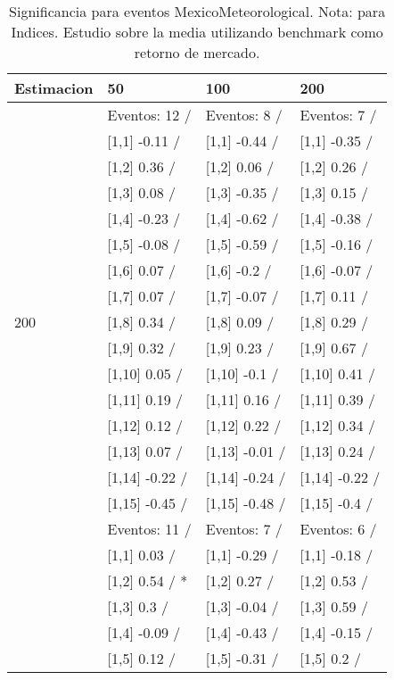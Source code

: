 \begin{table}

\caption{Significancia para eventos MexicoMeteorological. Nota: para Indices. Estudio sobre la media utilizando benchmark como retorno de mercado.}
\centering
\begin{tabular}[t]{llll}
\toprule
Estimacion & 50 & 100 & 200\\
\midrule
 & Eventos:  12 / & Eventos:  8 / & Eventos:  7 /\\
 & {}[1,1] -0.11  / & {}[1,1] -0.44  / & {}[1,1] -0.35  /\\
 & {}[1,2] 0.36  / & {}[1,2] 0.06  / & {}[1,2] 0.26  /\\
 & {}[1,3] 0.08  / & {}[1,3] -0.35  / & {}[1,3] 0.15  /\\
 & {}[1,4] -0.23  / & {}[1,4] -0.62  / & {}[1,4] -0.38  /\\
\addlinespace
 & {}[1,5] -0.08  / & {}[1,5] -0.59  / & {}[1,5] -0.16  /\\
 & {}[1,6] 0.07  / & {}[1,6] -0.2  / & {}[1,6] -0.07  /\\
 & {}[1,7] 0.07  / & {}[1,7] -0.07  / & {}[1,7] 0.11  /\\
200 & {}[1,8] 0.34  / & {}[1,8] 0.09  / & {}[1,8] 0.29  /\\
 & {}[1,9] 0.32  / & {}[1,9] 0.23  / & {}[1,9] 0.67  /\\
\addlinespace
 & {}[1,10] 0.05  / & {}[1,10] -0.1  / & {}[1,10] 0.41  /\\
 & {}[1,11] 0.19  / & {}[1,11] 0.16  / & {}[1,11] 0.39  /\\
 & {}[1,12] 0.12  / & {}[1,12] 0.22  / & {}[1,12] 0.34  /\\
 & {}[1,13] 0.07  / & {}[1,13] -0.01  / & {}[1,13] 0.24  /\\
 & {}[1,14] -0.22  / & {}[1,14] -0.24  / & {}[1,14] -0.22  /\\
\addlinespace
 & {}[1,15] -0.45  / & {}[1,15] -0.48  / & {}[1,15] -0.4  /\\
 & Eventos:  11 / & Eventos:  7 / & Eventos:  6 /\\
 & {}[1,1] 0.03  / & {}[1,1] -0.29  / & {}[1,1] -0.18  /\\
 & {}[1,2] 0.54  / * & {}[1,2] 0.27  / & {}[1,2] 0.53  /\\
 & {}[1,3] 0.3  / & {}[1,3] -0.04  / & {}[1,3] 0.59  /\\
\addlinespace
 & {}[1,4] -0.09  / & {}[1,4] -0.43  / & {}[1,4] -0.15  /\\
 & {}[1,5] 0.12  / & {}[1,5] -0.31  / & {}[1,5] 0.2  /\\

\end{tabular}
\end{table}

